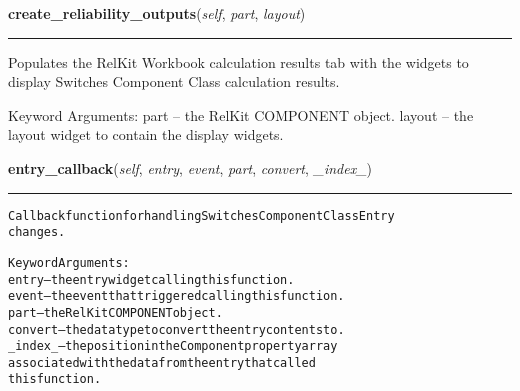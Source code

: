     \label{reliafree:switches:switch:Switch:create_reliability_outputs}

    \vspace{0.5ex}

\hspace{.8\funcindent}\begin{boxedminipage}{\funcwidth}

    \raggedright \textbf{create\_reliability\_outputs}(\textit{self}, \textit{part}, \textit{layout})

    \vspace{-1.5ex}

    \rule{\textwidth}{0.5\fboxrule}
\setlength{\parskip}{2ex}
    Populates the RelKit Workbook calculation results tab with the 
    widgets to display Switches Component Class calculation results.

    Keyword Arguments: part   -- the RelKit COMPONENT object. layout -- 
    the layout widget to contain the display widgets.

\setlength{\parskip}{1ex}
    \end{boxedminipage}

    \label{reliafree:switches:switch:Switch:entry_callback}

    \vspace{0.5ex}

\hspace{.8\funcindent}\begin{boxedminipage}{\funcwidth}

    \raggedright \textbf{entry\_callback}(\textit{self}, \textit{entry}, \textit{event}, \textit{part}, \textit{convert}, \textit{\_index\_})

    \vspace{-1.5ex}

    \rule{\textwidth}{0.5\fboxrule}
\setlength{\parskip}{2ex}
\begin{alltt}
Callback function for handling Switches Component Class Entry
changes.

Keyword Arguments:
  entry -- the entry widget calling this function.
  event -- the event that triggered calling this function.
   part -- the RelKit COMPONENT object.
convert -- the data type to convert the entry contents to.
\_index\_ -- the position in the Component property array
           associated with the data from the entry that called
           this function.
\end{alltt}

\setlength{\parskip}{1ex}
    \end{boxedminipage}

